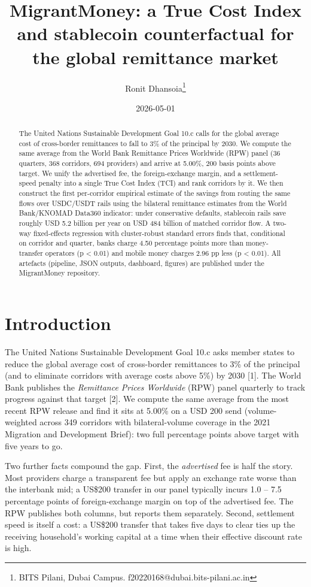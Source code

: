 \documentclass[
  11pt,
]{article}
\title{MigrantMoney: a True Cost Index and stablecoin counterfactual for
the global remittance market}
\author{Ronit Dhansoia\footnote{BITS Pilani, Dubai Campus.
  f20220168@dubai.bits-pilani.ac.in}}
\date{2026-05-01}
\begin{document}
\maketitle
\begin{abstract}
The United Nations Sustainable Development Goal 10.c calls for the
global average cost of cross-border remittances to fall to 3\% of the
principal by 2030. We compute the same average from the World Bank
Remittance Prices Worldwide (RPW) panel (36 quarters, 368 corridors, 694
providers) and arrive at 5.00\%, 200 basis points above target. We unify
the advertised fee, the foreign-exchange margin, and a settlement-speed
penalty into a single True Cost Index (TCI) and rank corridors by it. We
then construct the first per-corridor empirical estimate of the savings
from routing the same flows over USDC/USDT rails using the bilateral
remittance estimates from the World Bank/KNOMAD Data360 indicator: under
conservative defaults, stablecoin rails save roughly USD 5.2 billion per
year on USD 484 billion of matched corridor flow. A two-way
fixed-effects regression with cluster-robust standard errors finds that,
conditional on corridor and quarter, banks charge 4.50 percentage points
more than money-transfer operators (p \textless{} 0.01) and mobile money
charges 2.96 pp less (p \textless{} 0.01). All artefacts (pipeline, JSON
outputs, dashboard, figures) are published under the MigrantMoney
repository.
\end{abstract}

\section{Introduction}\label{introduction}

The United Nations Sustainable Development Goal 10.c asks member states
to reduce the global average cost of cross-border remittances to 3\% of
the principal (and to eliminate corridors with average costs above 5\%)
by 2030 {[}1{]}. The World Bank publishes the \emph{Remittance Prices
Worldwide} (RPW) panel quarterly to track progress against that target
{[}2{]}. We compute the same average from the most recent RPW release
and find it sits at 5.00\% on a USD 200 send (volume-weighted across 349
corridors with bilateral-volume coverage in the 2021 Migration and
Development Brief): two full percentage points above target with five
years to go.

Two further facts compound the gap. First, the \emph{advertised} fee is
half the story. Most providers charge a transparent fee but apply an
exchange rate worse than the interbank mid; a US\$200 transfer in our
panel typically incurs 1.0 -- 7.5 percentage points of foreign-exchange
margin on top of the advertised fee. The RPW publishes both columns, but
reports them separately. Second, settlement speed is itself a cost: a
US\$200 transfer that takes five days to clear ties up the receiving
household's working capital at a time when their effective discount rate
is high.
\end{document}
